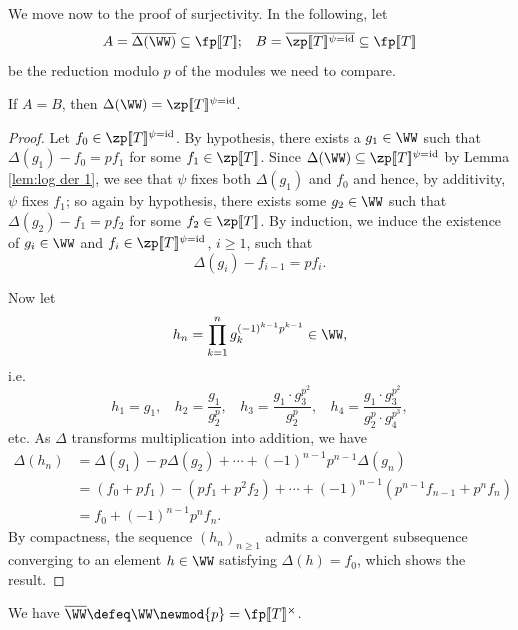 \documentclass[a4paper,10pt, english, reqno]{smfart}
\newcommand{\lsem}{[\! [}
\newcommand{\rsem}{]\! ]}
\numberwithin{equation}{section}
\begin{document}
We move now to the proof of surjectivity. In the following, let
\[ A = \overline{\Delta(\WW)} \subseteq \fp\lsem T\rsem ; \;\;\; B = \overline{\zp\lsem T\rsem ^{\psi=\mathrm{id}}} \subseteq \fp\lsem T\rsem  \]
be the reduction modulo $p$ of the modules we need to compare.

\begin{lemma} \label{lem:log der red mod p}
	If $A = B$, then $\Delta(\WW) = \zp\lsem T\rsem ^{\psi=\mathrm{id}}$.
\end{lemma}

\begin{proof}
	Let $f_0 \in \zp\lsem T\rsem ^{\psi=\mathrm{id}}$. By hypothesis, there exists a $g_1 \in \WW$ such that $\Delta(g_1) - f_0 = p f_1$ for some $f_1 \in \zp\lsem T\rsem $. Since $\Delta(\WW) \subseteq \zp\lsem T\rsem ^{\psi=\mathrm{id}}$ by Lemma \ref{lem:log der 1}, we see that $\psi$ fixes both $\Delta(g_1)$ and $f_0$ and hence, by additivity, $\psi$ fixes $f_1$; so again by hypothesis, there exists some $g_2 \in \WW$ such that $\Delta(g_2) - f_1 = p f_2$ for some $f_2 \in \zp\lsem T\rsem $. By induction, we induce the existence of $g_i \in \WW$ and $f_i \in \zp\lsem T\rsem ^{\psi=\mathrm{id}}$, $i \geq 1$, such that \[ \Delta(g_i) - f_{i - 1} = p f_i. \] 
	
    Now let 
	\[h_n = \prod_{k = 1}^{n}  g_k^{(-1)^{k-1}p^{k-1}} \in \WW,\]
	i.e. 
	\[
		h_1 = g_1, \ \ \ \ h_2 = \frac{g_1}{g_2^p}, \ \ \ \ h_3 = \frac{g_1\cdot g_3^{p^2}}{g_2^p}, \ \ \ \ h_4 = \frac{g_1 \cdot g_3^{p^2}}{g_2^p \cdot g_4^{p^3}}, 
	\]
	etc. As $\Delta$ transforms multiplication into addition, we have
	\begin{align*}
		\Delta(h_n) &= \Delta(g_1) - p\Delta(g_2) +  \cdots + (-1)^{n-1}p^{n-1}\Delta(g_n)\\
		&= (f_0 + pf_1) - (pf_1 + p^2f_2) + \cdots + (-1)^{n-1}(p^{n-1}f_{n-1} + p^nf_n)\\
		&= f_0 + (-1)^{n-1} p^{n} f_n.
	\end{align*}
	By compactness, the sequence $(h_n)_{n \geq 1}$ admits a convergent subsequence converging to an element $h \in \WW$ satisfying $\Delta(h) = f_0$, which shows the result.
\end{proof}


\begin{lemma} \label{lem:A mod p}
	We have $\overline{\WW}\defeq \WW\newmod{p} = \fp\lsem T\rsem ^\times$.
\end{lemma}
\end{document}
